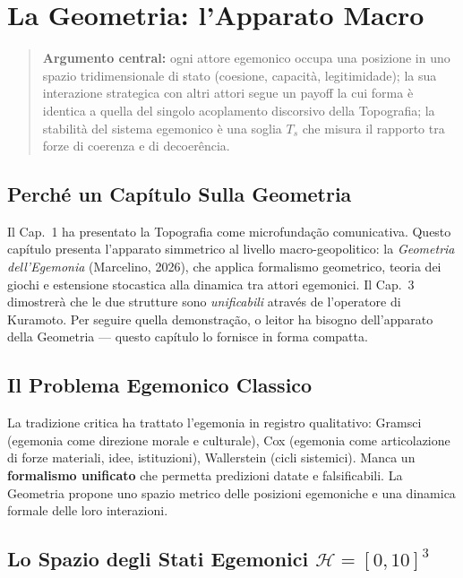 \chapter{La Geometria: l'Apparato
Macro}\label{la-geometria-lapparato-macro}

\begin{quote}
\textbf{Argumento central:} ogni attore egemonico occupa una posizione
in uno spazio tridimensionale di stato (coesione, capacità,
legitimidade); la sua interazione strategica con altri attori segue un
payoff la cui forma è identica a quella del singolo acoplamento
discorsivo della Topografia; la stabilità del sistema egemonico è una
soglia \(T_s\) che misura il rapporto tra forze di coerenza e di
decoerência.
\end{quote}



\section{Perché un Capítulo Sulla
Geometria}\label{perchuxe9-un-capítulo-sulla-geometria}

Il Cap.~1 ha presentato la Topografia come microfundação comunicativa.
Questo capítulo presenta l'apparato simmetrico al livello
macro-geopolitico: la \emph{Geometria dell'Egemonia} (Marcelino, 2026),
che applica formalismo geometrico, teoria dei giochi e estensione
stocastica alla dinamica tra attori egemonici. Il Cap.~3 dimostrerà che
le due strutture sono \emph{unificabili} através de l'operatore di
Kuramoto. Per seguire quella demonstração, o leitor ha bisogno
dell'apparato della Geometria --- questo capítulo lo fornisce in forma
compatta.



\section{Il Problema Egemonico
Classico}\label{il-problema-egemonico-classico}

La tradizione critica ha trattato l'egemonia in registro qualitativo:
Gramsci (egemonia come direzione morale e culturale), Cox (egemonia come
articolazione di forze materiali, idee, istituzioni), Wallerstein (cicli
sistemici). Manca un \textbf{formalismo unificato} che permetta
predizioni datate e falsificabili. La Geometria propone uno spazio
metrico delle posizioni egemoniche e una dinamica formale delle loro
interazioni.



\section{\texorpdfstring{Lo Spazio degli Stati Egemonici
\(\mathcal{H} = [0, 10]^3\)}{Lo Spazio degli Stati Egemonici \textbackslash mathcal\{H\} = {[}0, 10{]}\^{}3}}\label{lo-spazio-degli-stati-egemonici-mathcalh-0-103}

